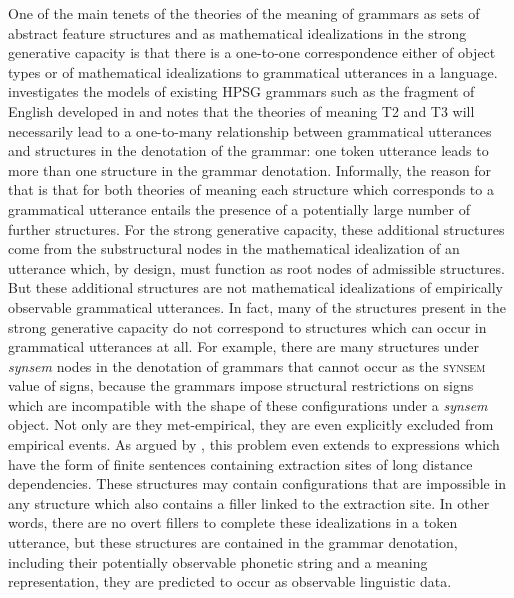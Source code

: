 \documentclass[output=paper
                ,modfonts
                ,nonflat
	        ,collection
	        ,collectionchapter
	        ,collectiontoclongg
 	        ,biblatex
                ,babelshorthands
                ,newtxmath
                ,draftmode
                ,colorlinks, citecolor=brown
]{./langsci/langscibook}
\begin{document}
{{One of the main tenets of the theories of the meaning of grammars as
sets of abstract feature structures and as mathematical idealizations
in the strong generative capacity is that there is a one-to-one
correspondence either of object types or of mathematical idealizations
to grammatical utterances in a language. \citet{Richter2007a}
investigates the models of existing HPSG grammars such as the fragment
of English developed in \cite{PollardSag1994} and notes that the
theories of meaning T2 and T3 will necessarily lead to a one-to-many
relationship between grammatical utterances and structures in the
denotation of the grammar: one token utterance leads to more than one
structure in the grammar denotation. Informally, the reason for that
is that for both theories of meaning each structure which corresponds
to a grammatical utterance entails the presence of a potentially large
number of further structures. For the strong generative capacity,
these additional structures come from the substructural nodes in the
mathematical idealization of an utterance which, by design, must
function as root nodes of admissible structures. But these additional
structures are not mathematical idealizations of empirically
observable grammatical utterances. In fact, many of the structures
present in the strong generative capacity do not correspond to
structures which can occur in grammatical utterances at all. For
example, there are many structures under \textit{synsem} nodes in the
denotation of grammars that cannot occur as the \textsc{synsem} value
of signs, because the grammars impose structural restrictions on signs
which are incompatible with the shape of these configurations under a
\textit{synsem} object. Not only are they met-empirical, they are even
explicitly excluded from empirical events. As argued by
\citet{Richter2007a}, this problem even extends to expressions which
have the form of finite sentences containing extraction sites of long
distance dependencies. These structures may contain configurations
that are impossible in any structure which also contains a filler
linked to the extraction site. In other words, there are no overt
fillers to complete these idealizations in a token utterance, but
these structures are contained
in the grammar denotation, including their potentially observable
phonetic string and a meaning representation, they are predicted to occur
as observable linguistic data.

}}
\end{document}
